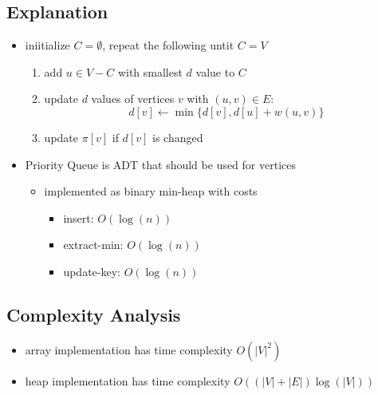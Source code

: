 \documentclass[11pt]{article}
\begin{document}
\subsection{Explanation}
\label{sec:org45b5bdd}
\begin{itemize}
\item iniitialize \(C = \emptyset\), repeat the following untit \(C = V\)
\begin{enumerate}
\item add \(u \in V - C\) with smallest \(d\) value to \(C\)
\item update \(d\) values of vertices \(v\) with \((u, v) \in E\):
$$
        d[v] \gets \min \{ d[v], d[u] + w(u, v) \}
     $$
\item update \(\pi[v]\) if \(d[v]\) is changed
\end{enumerate}

\item Priority Queue is ADT that should be used for vertices
\begin{itemize}
\item implemented as binary min-heap with costs
\begin{itemize}
\item insert: \(O(\log(n))\)
\item extract-min: \(O(\log(n))\)
\item update-key: \(O(\log(n))\)
\end{itemize}
\end{itemize}
\end{itemize}
\subsection{Complexity Analysis}
\label{sec:orgfe56315}
\begin{itemize}
\item array implementation has time complexity \(O(|V|^{2})\)
\item heap implementation has time complexity \(O((|V| + |E|)\log(|V|))\)
\end{itemize}
\end{document}
